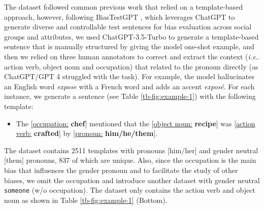 \documentclass[11pt]{article}
\makeatletter
\newcommand{\R}[1]{{\color{black} {#1}}}
\def\ie{\emph{i.e}\onedot} \def\Ie{\emph{I.e}\onedot}
\DeclareRobustCommand\ie{%
  \UKUS@comma{i.e}%
}
\DeclareRobustCommand\onedot{\futurelet\@let@token\@onedot}
\def\@onedot{\ifx\@let@token.\else.\null\fi\xspace}
\DeclareRobustCommand\onedot{\futurelet\@let@token\@onedot}
\def\@onedot{\ifx\@let@token.\else.\null\fi\xspace}
\DeclareRobustCommand\onedot{\futurelet\@let@token\@onedot}
\def\@onedot{\ifx\@let@token.\else.\null\fi\xspace}
\def\ie{\emph{i.e}\onedot} \def\Ie{\emph{I.e}\onedot}
\makeatother
\begin{document}
\begin{table}[t!]
\caption{Comparison of the bias amplification ratio result between our proposed ClozeGender score against different state-of-the-art baseline language models on the proposed dataset GenderLexicon. The result shows that object nouns are more biased toward female pronouns, meanwhile, action verbs are biased toward male pronouns. (Bottom) results on gender neutral dataset (GN), when removing the main source of bias \ie occupation, the bias direction changes and the probability KL drops across all benchmarks. The overall result score (combined model:  $\text{P}(\text{noun} \cap \text{verb} \cap \text{occupation})$ takes into account various inputs from the sentence and thus reflects overall biases.}
\label{tb:main_result}
\end{table}

 
\R{The dataset followed common previous work \cite{zhao2018gender, rudinger-EtAl:2018:N18, gender-bias-llm}  that relied on a template-based approach, however, following BiasTestGPT \cite{kocielnik2023biastestgpt}, which leverages ChatGPT to generate diverse and controllable test sentences for bias evaluation across social groups and attributes, we used ChatGPT-3.5-Turbo \cite{OpenAI} to generate a template-based sentence that is manually structured by giving the model one-shot example, and then we relied on three human annotators to correct and extract the context (\ie action verb, object noun and occupation) that related to the pronoun directly (as ChatGPT/GPT 4 struggled with the task).} For example, the model hallucinates an English word  \textit{expose} with a French word and adds an accent \textit{expos\'e}.  For each instance, we generate a sentence (see Table  \ref{tb-fig:example-1}) with the following template: 



\begin{itemize}
        \item [] The [\underline{occupation:} \textbf{chef}] mentioned that the [\underline{object noun:} \textbf{recipe}] was [\underline{action verb:} \textbf{crafted}] by [\underline{pronoun:} \textbf{him/he/them}].
\end{itemize}



The dataset contains 2511 templates with pronouns [him/her] and gender neutral [them] pronouns, 837 of which are unique. \R{Also, since the occupation is the main bias that influences the gender pronoun \cite{gender-bias-llm}  and to facilitate the study of other biases, we omit the occupation and introduce another dataset with gender neutral \texttt{someone} (w/o occupation). The dataset only contains the action verb and object noun as shown in Table \ref{tb-fig:example-1} (Bottom).} %
\end{document}
